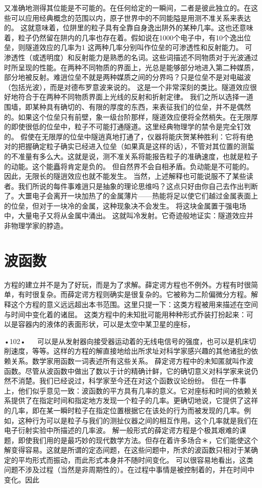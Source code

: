 又准确地测得其位能是不可能的。在任何给定的一瞬间，二者是彼此独立的。在这些可以应用经典概念的范围以内，原子世界中的不同能隘是用测不准关系来表达的。
这就意味着，位阱里的粒子具有全靠自身逸出阱外的某种几率。这也还意味着，粒子仍然留在阱内的几率也存在着。假如说在1000个电子中，有10个逸出位垒，则隧道效应的几率为1%
这两种几率分别叫作位垒的可渗透性和反射能力。
可渗透性（或透明度）和反射能力是熟悉的名词。这些词描述不同物质对于光波通过时所呈现的性能。在两种不同物质的界面上，光总是能够部分地进入第二种媒质，部分地被反射。难逍位垒不就是两种媒质之间的分界吗？只是位垒不是对电磁波（包括光波），而是对德布罗意波来说的。
这是一个非常深刻的类比。隧道效应很好地符合于在两种不同物质界面上光线的反射和折射定律。
我们之所以选择一道围墙，即某种具有确切的、有限的厚度的东西，来表征我们的位垒，并不是偶然的。如果这个位垒只有前壁，象一级台阶那样，隧道效应便将全然梢失。在无限厚的即使很低的位垒中，粒子不可能打通隧道。这里经典物理学的禁令是完全钉效的。
假使在无限厚的位垒中隧逍真地打通了，仪器将能庆贺某种胜利：它将有绝对的把握确定粒子确实已经进入位垒（如果真是这样的话），不管对其位置的测蜇的不准量有多么大。这就是说，测不准关系将能报告粒子的准确速度，也就是粒子的动能。这个能矗将肯定是负的。
但自然界不会自相矛盾。负动能是不可能的。因此，无限长的隧逍效应也就不能发生。
当然，上述解释也可能说服不了某些读者。我们所说的每件事难逍只是抽象的理论思维吗？这点只好由你自己去作出判断了。大噩电子会离开一块加热了的金属薄片——热能将足以使它们越过金属表面上的位垒，但对于一块冷的金属，这种现象决不会发生。
将这块金属置于强电场中，大量电子又将从金属中涌出。
这就叫冷发射。它奇迹般地证实：隧道效应并非物理学家的脖造。

\section{波函数}
方程的建立并不是为了好玩，而是为了求解。薛定谔方程也不例外。方程有时很简单，有时很复杂。而薛定谔方程则确实是很复杂的。它被称为二阶偏微分方程。解释这个方程的意义远远超出本书范围。这里只提一下：这类方程被用来描述在空间与时间中变化着的诸屈。
这类方程中的未知批可能用种种形式乔装打扮起来：可以是容器内的液体的表面形状，可以是太空中某卫星的座标，

•102•
  
可以是从发射器向接受器运动着的无线电信号的强度，也可以是机床切削速度，等等。这样的方程的解直接地给出所求址对科学家感兴趣的其他诸批的依赖关系。数学家用函数一词表述所有这些关系。
薛定谔方程中的未知匿就叫作波函数。尽管从波函数中做出了数以于计的精确计鲜，它的确切意义对科学家来说仍然不消楚。我们已经说过，科学家至今还在对这个函数议论纷纷。
但在一件事上，他们似乎意见一致：波函数的平方具有几率的意义。它对座标和时间的依赖关系提供了在指定时间和指定地方发现一个粒子的几率。更确切地说，它提供了这祥的几率，即在某一瞬时粒子在指定位置根据它在该处的行为而被发现的几率。例如，这种行为可以是粒子与我们的测扯仪器之间的相互作用。这个几率就是我们在电子衍射实验中所描述的几率波。
解一般形式的薛定谔方程是个极其艰难的课题，即使我们用的是最巧妙的现代数学方法。但存在着许多场合＊，它们能使这个解变得容易。这就是所谓的定态间题，在这些问题中，所求的波函数只相对于某确定的平均形式而振动，而此形式本身并不随时间变化。
可以很容易地看出，这类问题不涉及过程（当然是非周期性的）。在过程中事情是被控制着的，并在时间中变化。因此

